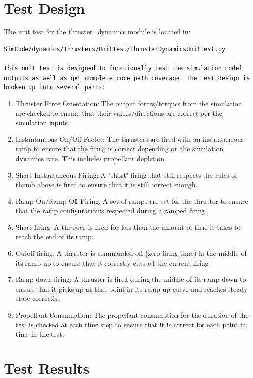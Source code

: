 \documentclass[]{LASPreport}
\begin{document}
\section{Test Design}
The unit test for the thruster\_dynamics module is located in:\\

\noindent
{\tt SimCode/dynamics/Thrusters/UnitTest/ThrusterDynamicsUnitTest.py \\
\\

\noindent This unit test is designed to functionally test the simulation model 
outputs as well as get complete code path coverage.  The test design is broken 
up into several parts:\\
\begin{enumerate}
\item{Thruster Force Orientation: The output forces/torques from the simulation 
  are checked to ensure that their values/directions are correct per the 
  simulation inputs.}
\item{Instantaneous On/Off Factor: The thrusters are fired with an 
  instantaneous ramp to ensure that the firing is correct depending on the 
  simulation dynamics rate.  This includes propellant depletion.}
\item{Short Instantaneous Firing: A "short" firing that still respects the 
  rules of thumb above is fired to ensure that it is still correct enough.}
\item{Ramp On/Ramp Off Firing: A set of ramps are set for the thruster to ensure 
  that the ramp configurationis respected during a ramped firing.}
\item{Short firing: A thruster is fired for less than the amount of time it 
   takes to reach the end of its ramp.}
\item{Cutoff firing: A thruster is commanded off (zero firing time) in the middle 
   of its ramp up to ensure that it correctly cuts off the current firing}
\item{Ramp down firing: A thruster is fired during the middle of its ramp down 
   to ensure that it picks up at that point in its ramp-up curve and reaches 
   steady state correctly.}
\item{Propellant Consumption: The propellant consumption for the duration of the 
    test is checked at each time step to ensure that it is correct for each 
    point in time in the test.}
\end{enumerate}


\section{Test Results}


}
\end{document}
